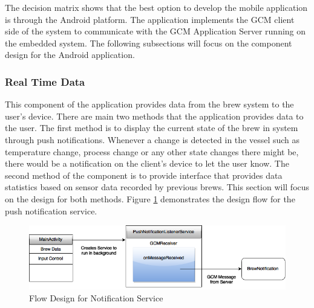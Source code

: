 \documentclass{article}
\begin{document}
The decision matrix shows that the best option to develop the mobile application is through the Android platform. The application implements the GCM client side of the system to communicate with the GCM Application Server running on the embedded system. The following subsections will focus on the component design for the Android application.


\subsubsection{Real Time Data}
This component of the application provides data from the brew system to the user's device. There are main two methods that the application provides data to the user. The first method is to display the current state of the brew in system through push notifications. Whenever a change is detected in the vessel such as temperature change, process change or any other state changes there might be, there would be a notification on the client's device to let the user know. The second method of the component is to provide interface that provides data statistics based on sensor data recorded by previous brews. This section will focus on the design for both methods. Figure \ref{fig:gcm-push-notification} demonstrates the design flow for the push notification service.

\begin{figure}[H]
\begin{center}
\includegraphics[scale=0.50]{gcm-push-notification.png}
\caption{Flow Design for Notification Service}
\label{fig:gcm-push-notification}
\end{center}
\end{figure}
\end{document}
